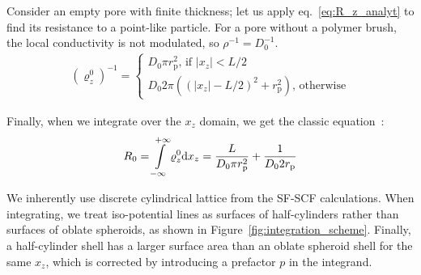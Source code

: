 \documentclass[10pt, a4paper]{article}
\begin{document}
\begin{multicols}{2}
Consider an empty pore with finite thickness; let us apply eq.~\ref{eq:R_z_analyt} to find its resistance to a point-like particle.
For a pore without a polymer brush, the local conductivity is not modulated, so $\rho^{-1} = D_0^{-1}$.
\begin{gather}
    \label{eq:r_z_empty}
    (\varrho_{z}^{0})^{-1} = 
    \begin{cases}
        D_0 \pi r_{\text{p}}^2 \text{, if } |x_z| < L/2
        \\
        D_0 2 \pi \left((|x_z|-L/2)^2 + r_{\text{p}}^2\right) \text{, otherwise} 
    \end{cases}
\end{gather}

Finally, when we integrate over the $x_z$ domain, we get the classic equation~\cite{Brunn1984}:
\begin{equation}
    \label{eq:r_empty}
    R_{0} = \int\displaylimits_{-\infty}^{+\infty} \varrho_{z}^{0} \text{d}x_z
    =\frac{L}{D_0 \pi r_{\text{p}}^2} + \frac{1}{D_0 2 r_{\text{p}}}
\end{equation}

We inherently use discrete cylindrical lattice from the SF-SCF calculations. 
When integrating, we treat iso-potential lines as surfaces of half-cylinders rather than surfaces of oblate spheroids, as shown in Figure~\ref{fig:integration_scheme}.
Finally, a half-cylinder shell has a larger surface area than an oblate spheroid shell for the same $x_z$, which is corrected by introducing a prefactor $p$ in the integrand.


\end{multicols}
\end{document}
